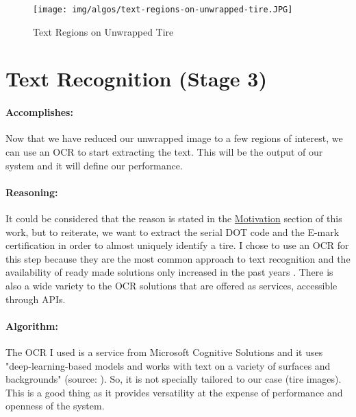 \begin{figure}
    \centering
    \texttt{[image: img/algos/text-regions-on-unwrapped-tire.JPG]}
    \caption{Text Regions on Unwrapped Tire}
    \label{fig:text-regions-on-unwrapped-tire}
\end{figure}

\section{Text Recognition (Stage 3)}\label{sec:text-recognition}

\paragraph*{Accomplishes:}\mbox{}\par

Now that we have reduced our unwrapped image to a few regions of interest, we can use an OCR to start extracting the text. This will be the output of our system and it will define our performance.

\paragraph*{Reasoning:}\mbox{}\par

It could be considered that the reason is stated in the \hyperref[sec:motivation]{Motivation} section of this work, but to reiterate, we want to extract the serial DOT code and the E-mark certification in order to almost uniquely identify a tire. I chose to use an OCR for this step because they are the most common approach to text recognition and the availability of ready made solutions only increased in the past years \cite{site:OCR_comparison}. There is also a wide variety to the OCR solutions that are offered as services, accessible through APIs.

\paragraph*{Algorithm:}\mbox{}\par
The OCR I used is a service from Microsoft Cognitive Solutions \cite{site:Microsoft_Cognitive_Services} and it uses "deep-learning-based models and works with text on a variety of surfaces and backgrounds" (source: \cite{site:Microsoft_Cognitive_Services-Explained}). So, it is not specially tailored to our case (tire images). This is a good thing as it provides versatility at the expense of performance and openness of the system.

